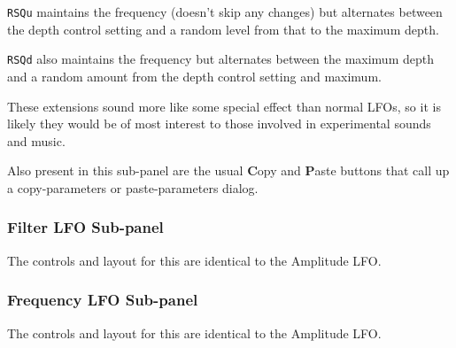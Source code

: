    \texttt{RSQu} maintains the frequency (doesn't skip any changes) but
   alternates between the depth control setting and a random level from that
   to the maximum depth.

   \texttt{RSQd} also maintains the frequency but alternates between the
   maximum depth and a random amount from the depth control setting and
   maximum.

   These extensions sound more like some special effect than normal LFOs, so
   it is likely they would be of most interest to those involved in
   experimental sounds and music.

   Also present in this sub-panel are the usual \textbf{C}opy
   and \textbf{P}aste buttons that call up a copy-parameters or
   paste-parameters dialog.


\subsubsection{Filter LFO Sub-panel}
\label{subsubsec:filter_lfo_sub_panel}

   The controls and layout for this are identical to the Amplitude LFO.

\subsubsection{Frequency LFO Sub-panel}
\label{subsubsec:frequency_lfo_sub_panel}

   The controls and layout for this are identical to the Amplitude LFO.
\iffalse
\begin{figure}[H]
   \centering
   \texttt{[image: subpanels/Frequency\_LFO.png]}
   \caption[Frequency LFO Sub-Panel]{Frequency LFO Sub-Panel}
   \label{fig:frequency_lfo_subpanel}
\end{figure}

   This panel is basically identical to the Filter LFO panel described
   in the previous section.

\fi

